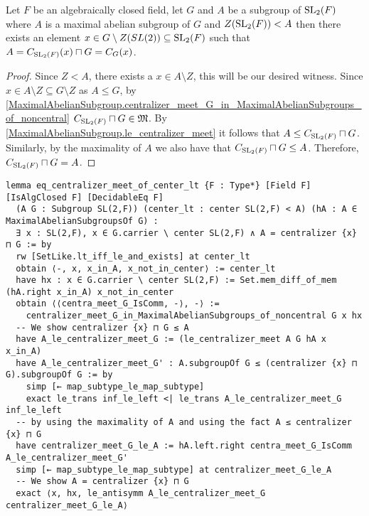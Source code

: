 \begin{lemma}
  \label{MaximalAbelianSubgroup.eq_centralizer_meet_of_center_lt}
  \leanok
  Let $F$ be an algebraically closed field, let $G$ and $A$ be a subgroup of $\operatorname{SL}_2(F)$ where $A$ is a maximal abelian subgroup of $G$ and $Z(\operatorname{SL}_2(F)) < A$ 
  then there exists an element $x \in G \setminus Z(SL(2)) \subseteq \operatorname{SL}_2(F)$ such that
  $A = C_{\operatorname{SL}_2(F)}(x) \sqcap G = C_{G}(x)$.
\end{lemma}
\begin{proof}
  \leanok
  Since $Z < A$, there exists a $x \in A \setminus Z$, this will be our desired witness. Since $x \in A \setminus Z \subseteq G \setminus Z$ as $A \le G$, by \ref{MaximalAbelianSubgroup.centralizer_meet_G_in_MaximalAbelianSubgroups_of_noncentral}
  $C_{\operatorname{SL}_2(F)} \sqcap G \in \mathfrak{M}$. By \ref{MaximalAbelianSubgroup.le_centralizer_meet} it follows that $A \le C_{\operatorname{SL}_2(F)} \sqcap G$. Similarly, by the maximality of $A$ we also have
  that $C_{\operatorname{SL}_2(F)} \sqcap G \le A$. Therefore, $C_{\operatorname{SL}_2(F)} \sqcap G = A$.
\end{proof}
\begin{footnotesize}
\begin{verbatim}
lemma eq_centralizer_meet_of_center_lt {F : Type*} [Field F] [IsAlgClosed F] [DecidableEq F]
  (A G : Subgroup SL(2,F)) (center_lt : center SL(2,F) < A) (hA : A ∈ MaximalAbelianSubgroupsOf G) :
  ∃ x : SL(2,F), x ∈ G.carrier \ center SL(2,F) ∧ A = centralizer {x} ⊓ G := by
  rw [SetLike.lt_iff_le_and_exists] at center_lt
  obtain ⟨-, x, x_in_A, x_not_in_center⟩ := center_lt
  have hx : x ∈ G.carrier \ center SL(2,F) := Set.mem_diff_of_mem (hA.right x_in_A) x_not_in_center
  obtain ⟨⟨centra_meet_G_IsComm, -⟩, -⟩ :=
    centralizer_meet_G_in_MaximalAbelianSubgroups_of_noncentral G x hx
  -- We show centralizer {x} ⊓ G ≤ A
  have A_le_centralizer_meet_G := (le_centralizer_meet A G hA x x_in_A)
  have A_le_centralizer_meet_G' : A.subgroupOf G ≤ (centralizer {x} ⊓ G).subgroupOf G := by
    simp [← map_subtype_le_map_subtype]
    exact le_trans inf_le_left <| le_trans A_le_centralizer_meet_G inf_le_left
  -- by using the maximality of A and using the fact A ≤ centralizer {x} ⊓ G
  have centralizer_meet_G_le_A := hA.left.right centra_meet_G_IsComm A_le_centralizer_meet_G'
  simp [← map_subtype_le_map_subtype] at centralizer_meet_G_le_A
  -- We show A = centralizer {x} ⊓ G
  exact ⟨x, hx, le_antisymm A_le_centralizer_meet_G centralizer_meet_G_le_A⟩
\end{verbatim}
\end{footnotesize}


